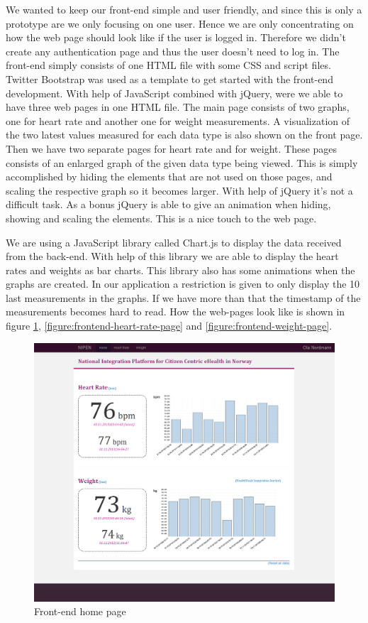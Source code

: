 We wanted to keep our front-end simple and user friendly, and since this is only a prototype are we only focusing on one user.
Hence we are only concentrating on how the web page should look like if the user is logged in. 
Therefore we didn't create any authentication page and thus the user doesn't need to log in. 
The front-end simply consists of one HTML file with some CSS and script files.
Twitter Bootstrap was used as a template to get started with the front-end development.
With help of JavaScript combined with jQuery, were we able to have three web pages in one HTML file. 
The main page consists of two graphs, one for heart rate and another one for weight measurements. 
A visualization of the two latest values measured for each data type is also shown on the front page.
Then we have two separate pages for heart rate and for weight.
These pages consists of an enlarged graph of the given data type being viewed.
This is simply accomplished by hiding the elements that are not used on those pages, and scaling the respective graph so it becomes larger.
With help of jQuery it's not a difficult task.
As a bonus jQuery is able to give an animation when hiding, showing and scaling the elements.
This is a nice touch to the web page.

We are using a JavaScript library called Chart.js to display the data received from the back-end. 
With help of this library we are able to display the heart rates and weights as bar charts.
This library also has some animations when the graphs are created.
In our application a restriction is given to only display the 10 last measurements in the graphs.
If we have more than that the timestamp of the measurements becomes hard to read.
How the web-pages look like is shown in figure \ref{figure:frontend-main-page}, \ref{figure:frontend-heart-rate-page} and \ref{figure:frontend-weight-page}.

\begin{figure}[H]
\centering
\includegraphics[scale=0.4]{../Figures/frontend-main-page.png}
\caption{Front-end home page}
\label{figure:frontend-main-page}
\end{figure}

